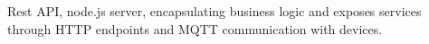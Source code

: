Rest API, node.js server, encapsulating business logic and exposes services through HTTP endpoints and MQTT communication with devices.